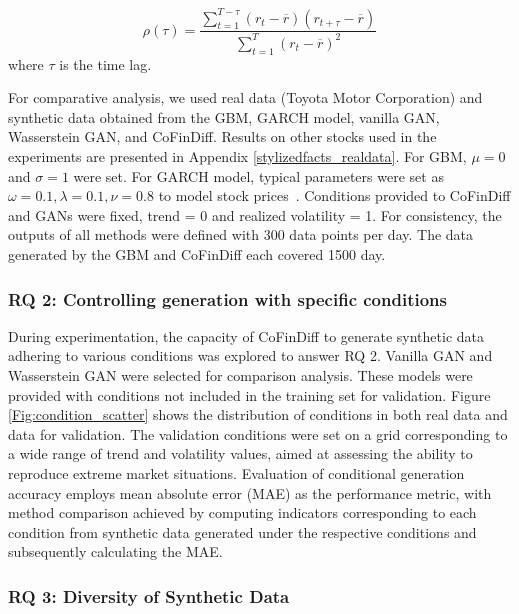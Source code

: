 \documentclass{article}
\begin{document}
\begin{equation}
    \rho(\tau) = \frac{\sum_{t=1}^{T-\tau} (r_t - \overline{r})(r_{t+\tau} - \overline{r})}{\sum_{t=1}^{T} (r_t - \overline{r})^2}
\end{equation}
where $\tau$ is the time lag.


For comparative analysis, we used real data (Toyota Motor Corporation) and synthetic data obtained from the GBM, GARCH model, vanilla GAN, Wasserstein GAN, and CoFinDiff.
Results on other stocks used in the experiments are presented in Appendix \ref{stylizedfacts_realdata}.
For GBM, $\mu = 0$ and $\sigma = 1$ were set.
For GARCH model, typical parameters were set as $\omega=0.1, \lambda=0.1, \nu=0.8$ to model stock prices~\cite{5a87335d-68e7-3cf5-bb64-13813f1b0f7f}.
Conditions provided to CoFinDiff and GANs were fixed, trend = 0 and realized volatility = 1.
For consistency, the outputs of all methods were defined with 300 data points per day. The data generated by the GBM and CoFinDiff each covered 1500 day.


\subsubsection{RQ 2: Controlling generation with specific conditions}

During experimentation, the capacity of CoFinDiff to generate synthetic data adhering to various conditions was explored to answer RQ 2.
Vanilla GAN and Wasserstein GAN were selected for comparison analysis.
These models were provided with conditions not included in the training set for validation.
Figure \ref{Fig:condition_scatter} shows the distribution of conditions in both real data and data for validation.
The validation conditions were set on a grid corresponding to a wide range of trend and volatility values, aimed at assessing the ability to reproduce extreme market situations.
Evaluation of conditional generation accuracy employs mean absolute error (MAE) as the performance metric, with method comparison achieved by computing indicators corresponding to each condition from synthetic data generated under the respective conditions and subsequently calculating the MAE.


\subsubsection{RQ 3: Diversity of Synthetic Data}
\end{document}
